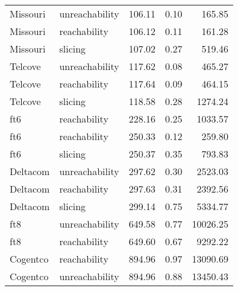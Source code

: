 \begin{tabular}{llrrr}
Missouri & unreachability & 106.11 & 0.10 & 165.85 \\
Missouri & reachability & 106.12 & 0.11 & 161.28 \\
Missouri & slicing & 107.02 & 0.27 & 519.46 \\
Telcove & unreachability & 117.62 & 0.08 & 465.27 \\
Telcove & reachability & 117.64 & 0.09 & 464.15 \\
Telcove & slicing & 118.58 & 0.28 & 1274.24 \\
ft6 & reachability & 228.16 & 0.25 & 1033.57 \\
ft6 & reachability & 250.33 & 0.12 & 259.80 \\
ft6 & slicing & 250.37 & 0.35 & 793.83 \\
Deltacom & unreachability & 297.62 & 0.30 & 2523.03 \\
Deltacom & reachability & 297.63 & 0.31 & 2392.56 \\
Deltacom & slicing & 299.14 & 0.75 & 5334.77 \\
ft8 & unreachability & 649.58 & 0.77 & 10026.25 \\
ft8 & reachability & 649.60 & 0.67 & 9292.22 \\
Cogentco & reachability & 894.96 & 0.97 & 13090.69 \\
Cogentco & unreachability & 894.96 & 0.88 & 13450.43 \\
\bottomrule
\end{tabular}

